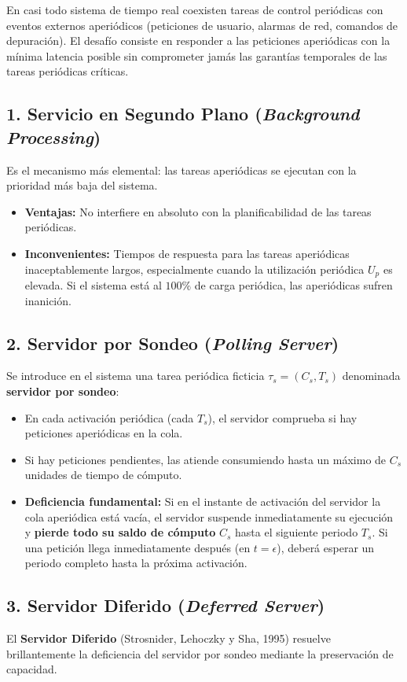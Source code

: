 En casi todo sistema de tiempo real coexisten tareas de control periódicas con eventos externos aperiódicos (peticiones de usuario, alarmas de red, comandos de depuración). El desafío consiste en responder a las peticiones aperiódicas con la mínima latencia posible sin comprometer jamás las garantías temporales de las tareas periódicas críticas.

\subsection{1. Servicio en Segundo Plano (\textit{Background Processing})}
Es el mecanismo más elemental: las tareas aperiódicas se ejecutan con la prioridad más baja del sistema.
\begin{itemize}[leftmargin=*]
    \item \textbf{Ventajas:} No interfiere en absoluto con la planificabilidad de las tareas periódicas.
    \item \textbf{Inconvenientes:} Tiempos de respuesta para las tareas aperiódicas inaceptablemente largos, especialmente cuando la utilización periódica $U_p$ es elevada. Si el sistema está al $100\%$ de carga periódica, las aperiódicas sufren inanición.
\end{itemize}

\subsection{2. Servidor por Sondeo (\textit{Polling Server})}
Se introduce en el sistema una tarea periódica ficticia $\tau_s = (C_s, T_s)$ denominada \textbf{servidor por sondeo}:
\begin{itemize}[leftmargin=*]
    \item En cada activación periódica (cada $T_s$), el servidor comprueba si hay peticiones aperiódicas en la cola.
    \item Si hay peticiones pendientes, las atiende consumiendo hasta un máximo de $C_s$ unidades de tiempo de cómputo.
    \item \textbf{Deficiencia fundamental:} Si en el instante de activación del servidor la cola aperiódica está vacía, el servidor suspende inmediatamente su ejecución y \textbf{pierde todo su saldo de cómputo} $C_s$ hasta el siguiente periodo $T_s$. Si una petición llega inmediatamente después (en $t = \epsilon$), deberá esperar un periodo completo hasta la próxima activación.
\end{itemize}

\subsection{3. Servidor Diferido (\textit{Deferred Server})}
El \textbf{Servidor Diferido} (Strosnider, Lehoczky y Sha, 1995) resuelve brillantemente la deficiencia del servidor por sondeo mediante la preservación de capacidad.

